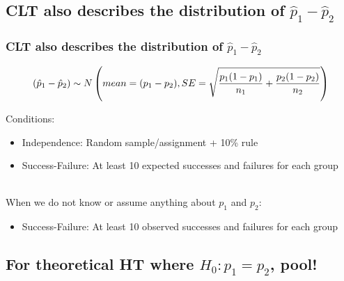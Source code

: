 \documentclass[slidestop,compress,mathserif,12pt,t,professionalfonts,xcolor=table]{beamer}
\begin{document}

\subsection{CLT also describes the distribution of $\hat{p}_1 - \hat{p}_2$}
\label{mi1}


\begin{frame}
\frametitle{CLT also describes the distribution of $\hat{p}_1 - \hat{p}_2$}

\[ (\hat{p}_1 - \hat{p}_2) \sim N \left(  mean = (p_1 - p_2), SE = \sqrt{ \frac{p_1(1-p_1)}{n_1} + \frac{p_2(1-p_2)}{n_2} }  \right) \]

Conditions: 
\begin{itemize}
\item Independence: Random sample/assignment + 10\% rule
\item Success-Failure: At least 10 expected successes and failures for each group
\end{itemize}


\pause

\hfill \\

When we do not know or assume anything about $p_1$ and $p_2$:
\begin{itemize}
\item Success-Failure: At least 10 observed successes and failures for each group
\end{itemize}

\end{frame}


\subsection{For theoretical HT where $H_0: p_1 = p_2$, pool!}
\label{mi2}

\end{document}
